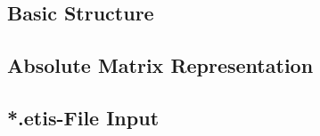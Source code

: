 \subsection{Basic Structure} 
\subsection{Absolute Matrix Representation} 
\subsection{*.etis-File Input} 
